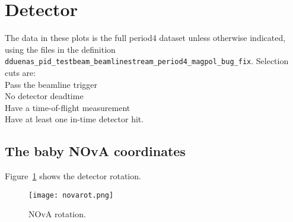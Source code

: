 \section{Detector}  
  
The data in these plots is the full period4 dataset unless otherwise indicated, using the files in the definition \texttt{dduenas\_pid\_testbeam\_beamlinestream\_period4\_magpol\_bug\_fix}. Selection cuts are:\\[1ex]
Pass the beamline trigger\\[1ex]
No detector deadtime\\[1ex]
Have a time-of-flight measurement\\[1ex]
Have at least one in-time detector hit.\\[1ex]

\subsection{The baby NOvA coordinates}


Figure~\ref{fig_novarot} shows the  detector rotation.

\begin{figure}[h]	   
 \centering
        	\texttt{[image: novarot.png]}	 
   \caption[short]{NOvA rotation.}
   \label{fig_novarot}
  \end{figure}

